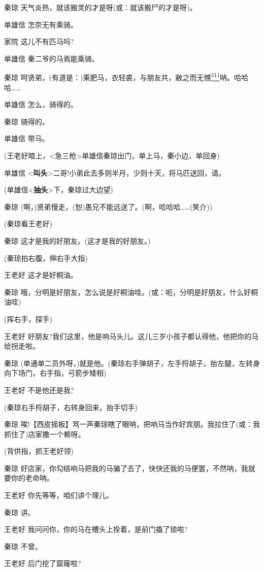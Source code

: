 秦琼 天气炎热，就该搬灵的才是呀(或：就该搬尸的才是呀)。

单雄信 怎奈无有乘骑。

家院 这儿不有匹马吗?

单雄信 秦二爷的马焉能乘骑。

秦琼
呵贤弟，(有道是：)乘肥马，衣轻裘，与朋友共，敝之而无憾\protect\hyperlink{fn311}{\textsuperscript{311}}呐。哈哈哈\ldots{}\ldots{}

单雄信 怎么，骑得的。

秦琼 骑得的。

单雄信 带马。

(王老好暗上，\textless{}急三枪\textgreater{}单雄信秦琼出门，单上马，秦小边，单回身)

单雄信
\textless{}\textbf{叫头}\textgreater{}二哥!小弟此去多则半月，少则十天，将马匹送回，请。

(单雄信\textless{}\textbf{抽头}\textgreater{}下，秦琼过大边望)

秦琼
(啊，)贤弟慢走，(恕)愚兄不能远送了。(啊，哈哈哈\ldots{}\ldots{}(笑介))

(秦琼看王老好)

秦琼 这才是我的好朋友。(这才是我的好朋友。)

(秦琼拍右腹，伸右手大指)

王老好 这才是好桐油。

秦琼
哦，分明是好朋友，怎么说是好桐油哇。(或：呃，分明是好朋友，什么好桐油哇)

(挥右手，探手)

王老好
好朋友?我们这里，他是响马头儿。这儿三岁小孩子都认得他，他把你的马给拐走啦。

秦琼
(单通单二员外呀，)就是他。(秦琼右手弹胡子，左手捋胡子，抬左腿，左转身向下场门，右手指，弓箭步矮相)

王老好 不是他还是我?

(秦琼右手捋胡子，右转身回来，抬手切手)

秦琼
唉!【西皮摇板】骂一声秦琼瞎了眼呐，把响马当作好宾朋。我拉住了(或：我抓住了)店家撒一个赖呀。

(背供指，抓王老好领)

秦琼
好店家，你勾结响马把我的马骗了去了，快快还我的马便罢，不然呐，我就要你的老命呐。

王老好 你先等等，咱们讲个理儿。

秦琼 讲。

王老好 我问问你，你的马在槽头上拴着，是前门撬了锁啦?

秦琼 不曾。

王老好 后门挖了窟窿啦?


